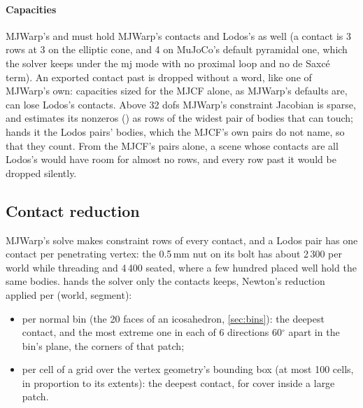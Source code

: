 \paragraph{Capacities} MJWarp's  and  must hold MJWarp's contacts and Lodos's as well (a contact is 3 rows at  3 on the elliptic cone, and 4 on MuJoCo's default pyramidal one, which the solver keeps under the mj mode with no proximal loop and no de Saxc\'e term). An exported contact past  is dropped without a word, like one of MJWarp's own: capacities sized for the MJCF alone, as MJWarp's defaults are, can lose Lodos's contacts. Above 32 dofs MJWarp's constraint Jacobian is sparse, and  estimates its nonzeros () as  rows of the widest pair of bodies that can touch;  hands it the Lodos pairs' bodies, which the MJCF's own pairs do not name, so that they count. From the MJCF's pairs alone, a scene whose contacts are all Lodos's would have room for almost no rows, and every row past it would be dropped silently.

\subsection{Contact reduction}\label{sec:reduce}

MJWarp's solve makes constraint rows of every contact, and a Lodos pair has one contact per penetrating vertex: the 0.5\,mm nut on its bolt has about 2\,300 per world while threading and 4\,400 seated, where a few hundred placed well hold the same bodies.  hands the solver only the contacts  keeps, Newton's reduction \cite{newton} applied per (world, segment):

\begin{itemize}
\item per normal bin (the 20 faces of an icosahedron, \cref{sec:bins}): the deepest contact, and the most extreme one in each of 6 directions 60$^\circ$ apart in the bin's plane, the corners of that patch;
\item per cell of a grid over the vertex geometry's bounding box (at most 100 cells, in proportion to its extents): the deepest contact, for cover inside a large patch.
\end{itemize}


